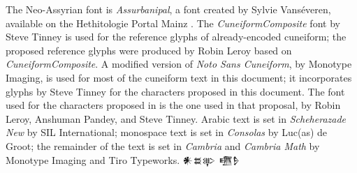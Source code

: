 \documentclass[10pt, a4paper, twoside]{article}
\newcommand\oneEighthIkuC{{\proposalfont\symbol{"12587}}}
\newcommand\oneBurʾuC{{\proposalfont\symbol{"1258E}}}
\newcommand\fiveBurʾuC{{\proposalfont\symbol{"12592}}}
\newcommand\oneBanTwoC{{\proposalfont\symbol{"12593}}}
\newcommand\fiveBanTwoC{{\proposalfont\symbol{"12597}}}
\newcommand{\changed}[1]{\highLight{#1}}
\begin{document}

The Neo-Assyrian font is \emph{Assurbanipal},
a font created by Sylvie Vanséveren,
available on the Hethitologie Portal Mainz \cite{Vanséveren2021}.
The \emph{CuneiformComposite} font by Steve Tinney is used 
for the reference glyphs of already-encoded cuneiform;
the proposed reference glyphs were produced by Robin Leroy based on
\emph{CuneiformComposite}.
A modified version of \emph{Noto Sans Cuneiform}, by Monotype Imaging,
is used for most of the cuneiform text in this document; it incorporates glyphs
by Steve Tinney for the characters proposed in this document.
The font used for the characters proposed in \cite{L2/24-210R}
is the one used in that proposal, by Robin Leroy, Anshuman Pandey, and Steve Tinney.
Arabic text is set in \emph{Scheherazade New} by SIL International;
monospace text is set in \emph{Consolas} by Luc(as) de Groot;
the remainder of the text is set in \emph{Cambria} and \emph{Cambria Math} by Monotype Imaging and Tiro Typeworks.
{\hspace*{\fill}\changed{\xsuxfont 𒉡~𒀠𒌀}}
\vfill{\hspace*{\fill}\xsuxfont 𒀭𒊺𒉀 𒍠𒊩}

\nocite{DCCLT}
\printbibheading[heading=bibintoc]
\printbibliography[heading=subbibintoc,title={Artefacts},type=artwork]
\printbibliography[heading=subbibintoc,title={ISO and Unicode documents},nottype=artwork,keyword=unicode]
\printbibliography[heading=subbibintoc,title={Online corpora and related projects},nottype=artwork,keyword=reference]
\printbibliography[heading=subbibintoc,title={Other documents},nottype=artwork,notkeyword=unicode,notkeyword=reference]
%
\end{document}
